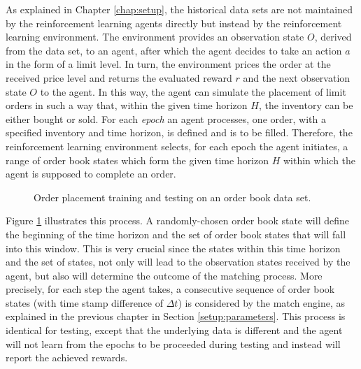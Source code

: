 As explained in Chapter \ref{chap:setup}, the historical data sets are not maintained by the reinforcement learning agents directly but instead by the reinforcement learning environment.
The environment provides an observation state $O$, derived from the data set, to an agent, after which the agent decides to take an action $a$ in the form of a limit level.
In turn, the environment prices the order at the received price level and returns the evaluated reward $r$ and the next observation state $O$ to the agent.
In this way, the agent can simulate the placement of limit orders in such a way that, within the given time horizon $H$, the inventory can be either bought or sold.
For each \textit{epoch} an agent processes, one order, with a specified inventory and time horizon, is defined and is to be filled.
Therefore, the reinforcement learning environment selects, for each epoch the agent initiates, a range of order book states which form the given time horizon $H$ within which the agent is supposed to complete an order.
\begin{figure}[H]
    \centering
    \caption{Order placement training and testing on an order book data set.}
    \label{fig:eval-orderbook-window}
\end{figure}
Figure \ref{fig:eval-orderbook-window} illustrates this process.
A randomly-chosen order book state will define the beginning of the time horizon and the set of order book states that will fall into this window.
This is very crucial since the states within this time horizon and the set of states, not only will lead to the observation states received by the agent, but also will determine the outcome of the matching process.
More precisely, for each step the agent takes, a consecutive sequence of order book states (with time stamp difference of $\Delta{t}$) is considered by the match engine, as explained in the previous chapter in Section \ref{setup:parameters}.
This process is identical for testing, except that the underlying data is different and the agent will not learn from the epochs to be proceeded during testing and instead will report the achieved rewards.

